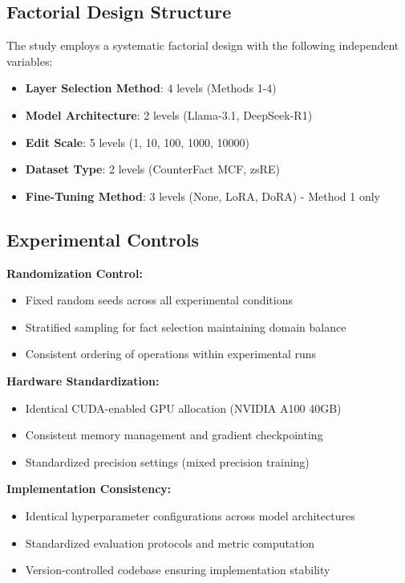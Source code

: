 \subsection{Factorial Design Structure}

The study employs a systematic factorial design with the following independent variables:

\begin{itemize}
    \item \textbf{Layer Selection Method}: 4 levels (Methods 1-4)
    \item \textbf{Model Architecture}: 2 levels (Llama-3.1, DeepSeek-R1)
    \item \textbf{Edit Scale}: 5 levels (1, 10, 100, 1000, 10000)
    \item \textbf{Dataset Type}: 2 levels (CounterFact MCF, zsRE)
    \item \textbf{Fine-Tuning Method}: 3 levels (None, LoRA, DoRA) - Method 1 only
\end{itemize}

\subsection{Experimental Controls}

\textbf{Randomization Control:}
\begin{itemize}
    \item Fixed random seeds across all experimental conditions
    \item Stratified sampling for fact selection maintaining domain balance
    \item Consistent ordering of operations within experimental runs
\end{itemize}

\textbf{Hardware Standardization:}
\begin{itemize}
    \item Identical CUDA-enabled GPU allocation (NVIDIA A100 40GB)
    \item Consistent memory management and gradient checkpointing
    \item Standardized precision settings (mixed precision training)
\end{itemize}

\textbf{Implementation Consistency:}
\begin{itemize}
    \item Identical hyperparameter configurations across model architectures
    \item Standardized evaluation protocols and metric computation
    \item Version-controlled codebase ensuring implementation stability
\end{itemize}


